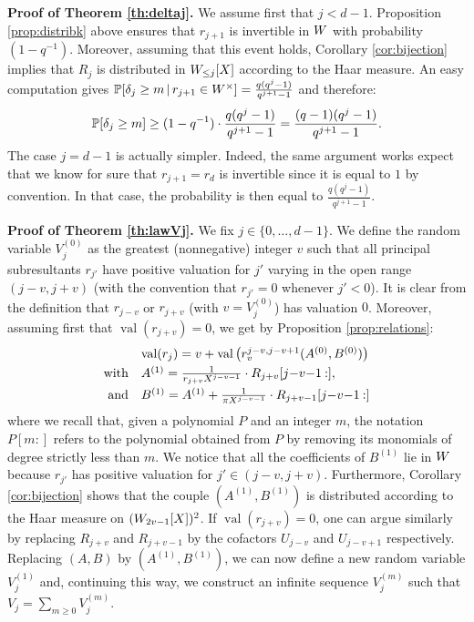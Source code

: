 \documentclass{article}
\DeclareMathOperator{\val}{val}
\begin{document}
\noindent
\textbf{Proof of Theorem \ref{th:deltaj}.}
We assume first that $j < d-1$. Proposition \ref{prop:distribk} above 
ensures that $r_{j+1}$ is invertible in $\A$ with probability 
$(1 - q^{-1})$. Moreover, assuming that this event holds, Corollary 
\ref{cor:bijection} implies that $R_j$ is distributed in $\A_{\leq 
j}[X]$ according to the Haar measure. An easy computation gives
$\P[\delta_j \geq m\,|\, r_{j+1} \in \A^\times ] =
\frac{q(q^j - 1)}{q^{j+1}-1}$
and therefore:
$$\P[\delta_j \geq m] \geq (1 - q^{-1}) \cdot
\frac{q(q^j - 1)}{q^{j+1}-1} =
\frac{(q-1)(q^j - 1)}{q^{j+1}-1}.$$
The case $j = d-1$ is actually simpler. Indeed, the same argument works 
expect that we know for sure that $r_{j+1} = r_d$ is invertible since it 
is equal to $1$ by convention. In that case, the probability is then 
equal to $\frac{q(q^j - 1)}{q^{j+1}-1}$.

\medskip

\noindent
\textbf{Proof of Theorem \ref{th:lawVj}.}
We fix $j \in \{0, \ldots, d-1\}$. 
We define the random variable $V_j^{(0)}$ as the greatest (nonnegative) 
integer $v$ such that all principal subresultants $r_{j'}$ have positive 
valuation for $j'$ varying in the open range $(j-v, j+v)$ (with the
convention that $r_{j'} = 0$ whenever $j' < 0$). It is clear from the 
definition that $r_{j-v}$ or $r_{j+v}$ (with $v = V_j^{(0)}$) has 
valuation $0$. Moreover, assuming first that $\val(r_{j+v}) = 0$, we 
get by Proposition \ref{prop:relations}:
$$\begin{array}{rl}
& \val(r_j) = v + \val\big(r_v^{j-v,j-v+1}(A^{(0)}, B^{(0)})\big) 
\smallskip \\
\text{with} &
A^{(1)} = \frac 1 {r_{j+v} X^{j-v-1}} \cdot R_{j+v}[j{-}v{-}1\:{:}], \smallskip \\
\text{and} &
B^{(1)} = A^{(1)} + \frac 1 {\pi X^{j-v-1}} \cdot R_{j+v-1}[j{-}v{-}1\:{:}]
\end{array}$$
where we recall that, given a polynomial $P$ and an integer $m$, the 
notation $P[m{:}]$ refers to the polynomial obtained from $P$ by
removing its monomials of degree strictly less than $m$.
We notice that all the coefficients of $B^{(1)}$ lie in $\A$ 
because $r_{j'}$ has positive valuation for $j' \in (j-v, j+v)$.
Furthermore, Corollary \ref{cor:bijection} shows that the 
couple $(A^{(1)}, B^{(1)})$ is distributed according to the Haar measure 
on $(\A_{2v-1}[X])^2$. If $\val(r_{j+v}) = 0$, one can argue similarly 
by replacing $R_{j+v}$ and $R_{j+v-1}$ by the cofactors $U_{j-v}$ and 
$U_{j-v+1}$ respectively. Replacing $(A,B)$ by $(A^{(1)}, B^{(1)})$, we 
can now define a new random variable $V_j^{(1)}$ and, continuing this 
way, we construct an infinite sequence $V_j^{(m)}$ such that
$V_j = \sum_{m \geq 0} V_j^{(m)}$.
\end{document}
